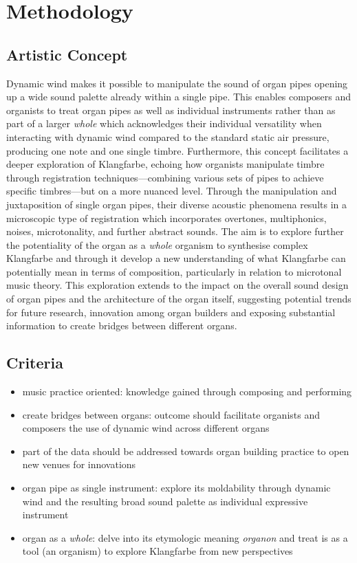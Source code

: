 \chapter{Methodology}

\section{Artistic Concept}

Dynamic wind makes it possible to manipulate the sound of organ pipes opening up a wide sound palette already within a single pipe. This enables composers and organists to treat organ pipes as well as individual instruments rather than as part of a larger \textit{whole} which acknowledges their individual versatility when interacting with dynamic wind compared to the standard static air pressure, producing one note and one single timbre. Furthermore, this concept facilitates a deeper exploration of Klangfarbe, echoing how organists manipulate timbre through registration techniques—combining various sets of pipes to achieve specific timbres—but on a more nuanced level. Through the manipulation and juxtaposition of single organ pipes, their diverse acoustic phenomena results in a microscopic type of registration which incorporates overtones, multiphonics, noises, microtonality, and further abstract sounds. The aim is to explore further the potentiality of the organ as a \textit{whole} organism to synthesise complex Klangfarbe and through it develop a new understanding of what Klangfarbe can potentially mean in terms of composition, particularly in relation to microtonal music theory. This exploration extends to the impact on the overall sound design of organ pipes and the architecture of the organ itself, suggesting potential trends for future research, innovation among organ builders and exposing substantial information to create bridges between different organs. 

\section{Criteria}

\begin{itemize}
\item music practice oriented: knowledge gained through composing and performing 
\item create bridges between organs: outcome should facilitate organists and composers the use of dynamic wind across different organs
\item part of the data should be addressed towards organ building practice to open new venues for innovations
\item organ pipe as single instrument: explore its moldability through dynamic wind and the resulting broad sound palette as individual expressive instrument 
\item organ as a \textit{whole}:  delve into its etymologic meaning \textit{organon} and treat is as a tool (an organism) to explore Klangfarbe from new perspectives
\end{itemize}

